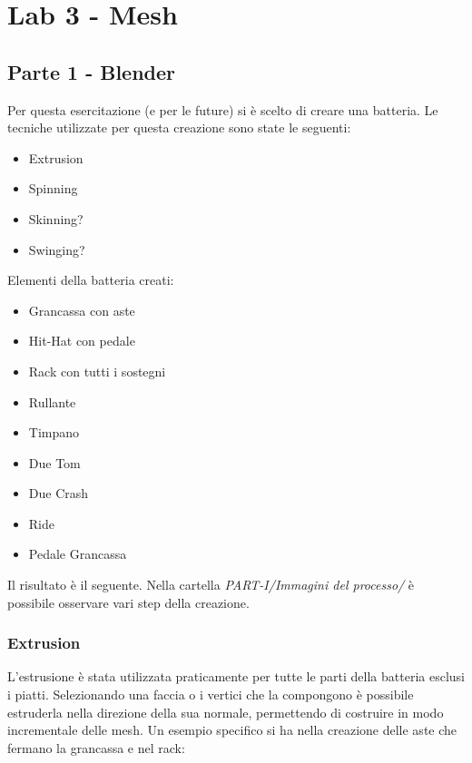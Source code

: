 \chapter*{Lab 3 - Mesh}

\section{Parte 1 - Blender}
Per questa esercitazione (e per le future) si è scelto di creare una batteria. Le tecniche utilizzate per questa creazione sono state le seguenti:
\begin{itemize}
  \item Extrusion
  \item Spinning
  \item Skinning?
  \item Swinging?
\end{itemize}
Elementi della batteria creati:
  \begin{multicols}{3}
    \begin{itemize}
      \item Grancassa con aste
	  \item Hit-Hat con pedale
	  \item Rack con tutti i sostegni
	  \item Rullante
	  \item Timpano
	  \item Due Tom
	  \item Due Crash
	  \item Ride
	  \item Pedale Grancassa
    \end{itemize}
  \end{multicols}
Il risultato è il seguente. Nella cartella \textit{PART-I/Immagini del processo/} è possibile osservare vari step della creazione.
\begin{figure}[hbt]
    \centering
	\vspace{-0.2cm}
\end{figure}

\subsection{Extrusion}
L'estrusione è stata utilizzata praticamente per tutte le parti della batteria esclusi i piatti. Selezionando una faccia o i vertici che la compongono è possibile estruderla nella direzione della sua normale, permettendo di costruire in modo incrementale delle mesh. Un esempio specifico si ha nella creazione delle aste che fermano la grancassa e nel rack:
\begin{figure}[hbt]
    \centering
	\vspace{-0.2cm}
\end{figure}

